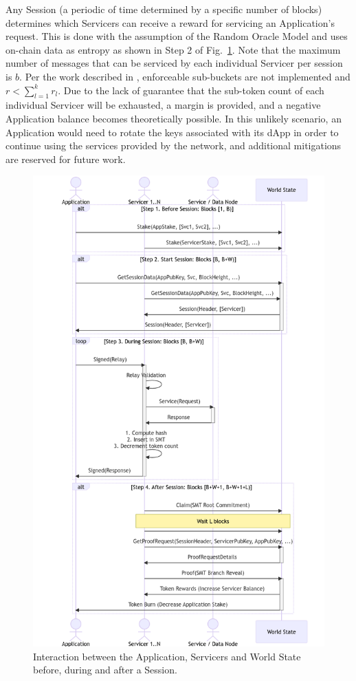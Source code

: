 \documentclass[runningheads]{llncs}
\begin{document}
Any Session (a periodic of time determined by a specific number of blocks) determines which Servicers can receive a reward for servicing an Application’s request. This is done with the assumption of the Random Oracle Model and uses on-chain data as entropy \cite{randomoracle1993} as shown in Step 2 of Fig.~\ref{fig:session-lifecycle}. Note that the maximum number of messages that can be serviced by each individual Servicer per session is $b$. Per the work described in \cite{wustl2021drl}, enforceable sub-buckets are not implemented and $r<\sum\limits_{l=1}^{k}r_l$. Due to the lack of guarantee that the sub-token count of each individual Servicer will be exhausted, a margin is provided, and a negative Application balance becomes theoretically possible. In this unlikely scenario, an Application would need to rotate the keys associated with its dApp in order to continue using the services provided by the network, and additional mitigations are reserved for future work.

\begin{figure}
    \centering
    \includegraphics[width=\textwidth]{session_lifecycle.png}
    \caption{Interaction between the Application, Servicers and World State before, during and after a Session.} \label{fig:session-lifecycle}
\end{figure}
\end{document}
